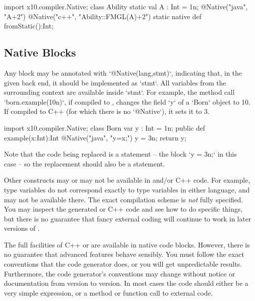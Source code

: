 \begin{xten}
import x10.compiler.Native;
class Ability {
  static val A : Int = 1n;
  @Native("java", "A+2")
  @Native("c++", "Ability::FMGL(A)+2")
  static native def fromStatic():Int;
}
\end{xten}
%




\subsection{Native Blocks}

Any block may be annotated with \xcd`@Native(lang,stmt)`, indicating that, in
the given back end, it should be implemented as \xcd`stmt`. All 
variables  from the surrounding context are available inside \xcd`stmt`. For
example, the method call \xcd`born.example(10n)`, if compiled to \Java{}, changes
the field \xcd`y` of a \xcd`Born` object to 10. If compiled to C++ (for which
there is no \xcd`@Native`), it sets it to 3. 
\begin{xten}
import x10.compiler.Native;
class Born {
  var y : Int = 1n; 
  public def example(x:Int):Int{
    @Native("java", "y=x;") 
    {y = 3n;}
    return y;
  }
}
\end{xten}
%

Note that the code being replaced is a statement -- the block \xcd`{y = 3n;}`
in this case -- so the replacement should also be a statement. 


Other \Xten{} constructs may or may not be available in \Java{} and/or C++ code.  For
example, type variables do not correspond exactly to type variables in either
language, and may not be available there.  The exact compilation scheme is
{\em not} fully specified.  You may inspect the generated \Java{} or C++ code and
see how to do specific things, but there is no guarantee that fancy external
coding will continue to work in later versions of \Xten{}.



The full facilities of C++ or \Java{} are available in native code blocks.
However, there is no guarantee that advanced features behave sensibly. You
must follow the exact conventions that the code generator does, or you will
get unpredictable results.  Furthermore, the code generator's conventions may
change without notice or documentation from version to version.  In most cases
the  code should either be a very simple expression, or a method
or function call to external code.


